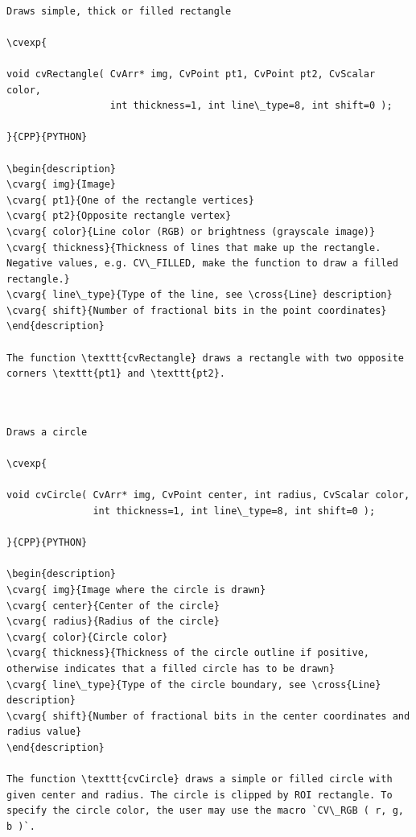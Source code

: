 \label{Rectangle}
\begin{verbatim}

Draws simple, thick or filled rectangle

\cvexp{

void cvRectangle( CvArr* img, CvPoint pt1, CvPoint pt2, CvScalar color,
                  int thickness=1, int line\_type=8, int shift=0 );

}{CPP}{PYTHON}

\begin{description}
\cvarg{ img}{Image}
\cvarg{ pt1}{One of the rectangle vertices}
\cvarg{ pt2}{Opposite rectangle vertex}
\cvarg{ color}{Line color (RGB) or brightness (grayscale image)}
\cvarg{ thickness}{Thickness of lines that make up the rectangle. Negative values, e.g. CV\_FILLED, make the function to draw a filled rectangle.}
\cvarg{ line\_type}{Type of the line, see \cross{Line} description}
\cvarg{ shift}{Number of fractional bits in the point coordinates}
\end{description}

The function \texttt{cvRectangle} draws a rectangle with two opposite corners \texttt{pt1} and \texttt{pt2}.


\end{verbatim}
\label{Circle}
\begin{verbatim}

Draws a circle

\cvexp{

void cvCircle( CvArr* img, CvPoint center, int radius, CvScalar color,
               int thickness=1, int line\_type=8, int shift=0 );

}{CPP}{PYTHON}

\begin{description}
\cvarg{ img}{Image where the circle is drawn}
\cvarg{ center}{Center of the circle}
\cvarg{ radius}{Radius of the circle}
\cvarg{ color}{Circle color}
\cvarg{ thickness}{Thickness of the circle outline if positive, otherwise indicates that a filled circle has to be drawn}
\cvarg{ line\_type}{Type of the circle boundary, see \cross{Line} description}
\cvarg{ shift}{Number of fractional bits in the center coordinates and radius value}
\end{description}

The function \texttt{cvCircle} draws a simple or filled circle with given center and radius. The circle is clipped by ROI rectangle. To specify the circle color, the user may use the macro `CV\_RGB ( r, g, b )`.


\end{verbatim}
